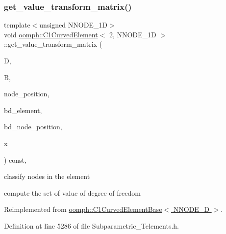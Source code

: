 \subsubsection{\texorpdfstring{get\+\_\+value\+\_\+transform\+\_\+matrix()}{get\_value\_transform\_matrix()}}
{\footnotesize\ttfamily template$<$unsigned N\+N\+O\+D\+E\+\_\+1D$>$ \\
void \hyperlink{classoomph_1_1C1CurvedElement}{oomph\+::\+C1\+Curved\+Element}$<$ 2, N\+N\+O\+D\+E\+\_\+1D $>$\+::get\+\_\+value\+\_\+transform\+\_\+matrix (\begin{DoxyParamCaption}\item[{\hyperlink{classoomph_1_1DenseMatrix}{Dense\+Matrix}$<$ double $>$ \&}]{D,  }\item[{\hyperlink{classoomph_1_1DenseMatrix}{Dense\+Matrix}$<$ double $>$ \&}]{B,  }\item[{\hyperlink{classoomph_1_1DenseMatrix}{Dense\+Matrix}$<$ double $>$ \&}]{node\+\_\+position,  }\item[{unsigned \&}]{bd\+\_\+element,  }\item[{\hyperlink{classoomph_1_1DenseMatrix}{Dense\+Matrix}$<$ double $>$ \&}]{bd\+\_\+node\+\_\+position,  }\item[{\hyperlink{classoomph_1_1Vector}{Vector}$<$ double $>$ \&}]{x }\end{DoxyParamCaption}) const\hspace{0.3cm}{\ttfamily [inline]}, {\ttfamily [virtual]}}

classify nodes in the element

compute the set of value of degree of freedom 

Reimplemented from \hyperlink{classoomph_1_1C1CurvedElementBase_a4735f6f63d4e545608bf485c7168e251}{oomph\+::\+C1\+Curved\+Element\+Base$<$ N\+N\+O\+D\+E\+\_\+D $>$}.



Definition at line 5286 of file Subparametric\+\_\+\+Telements.\+h.

\mbox{\label{classoomph_1_1C1CurvedElement_3_012_00_01NNODE__1D_01_4_a155a6dffffa34a092753697098bafb57}} 
